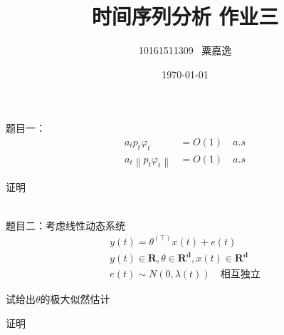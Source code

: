 \documentclass[12pt, a4paper]{ctexart}
\title{时间序列分析 作业三}
\author{10161511309 \, 粟嘉逸}
\date{\today}
\begin{document}
\maketitle{}

\begin{flushleft}
	\qquad 题目一：
		\begin{align*}
			a_tp_t\varphi_t&=O(1) \quad a.s\\
			a_t\left\| p_t\varphi_t\right\| &=O(1) \quad a.s
		\end{align*}

	\qquad 证明
	
		
		~\\	
	\qquad 题目二：考虑线性动态系统
		\begin{gather*}
			y(t)=\theta^(\top)x(t)+e(t)\\
			y(t)\in \mathbf{R},\theta\in \mathbf{R^d},x(t)\in \mathbf{R^d}\\
			e(t)\sim N(0,\lambda(t)) \quad \mbox{相互独立}
		\end{gather*}
		
	\qquad 试给出$\theta$的极大似然估计
	
	\qquad 证明
	
\end{flushleft}
\end{document}
